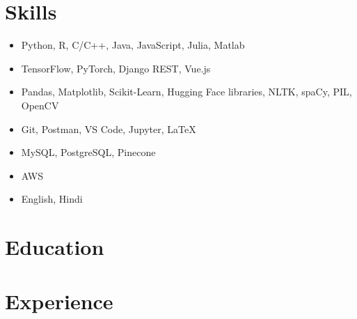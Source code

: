 \documentclass[letterpaper, 10pt]{article}
\begin{document}






\section{Skills}

\begin{itemize}[itemsep=-2px, parsep=1pt, leftmargin=130pt]
  \item[\textbf{Programming Languages}] Python, R, C/C++, Java, JavaScript, Julia, Matlab
  \item[\textbf{Frameworks}] TensorFlow, PyTorch, Django REST, Vue.js
  \item[\textbf{Libraries}] Pandas, Matplotlib, Scikit-Learn, Hugging Face libraries, NLTK, spaCy, PIL, OpenCV
  \item[\textbf{Tools}] Git, Postman, VS Code, Jupyter, LaTeX
  \item[\textbf{Databases}] MySQL, PostgreSQL, Pinecone
  \item[\textbf{Cloud Platforms}] AWS
  \item[\textbf{Languages}] English, Hindi
\end{itemize}


\section{Education}




\section{Experience}
\end{document}
